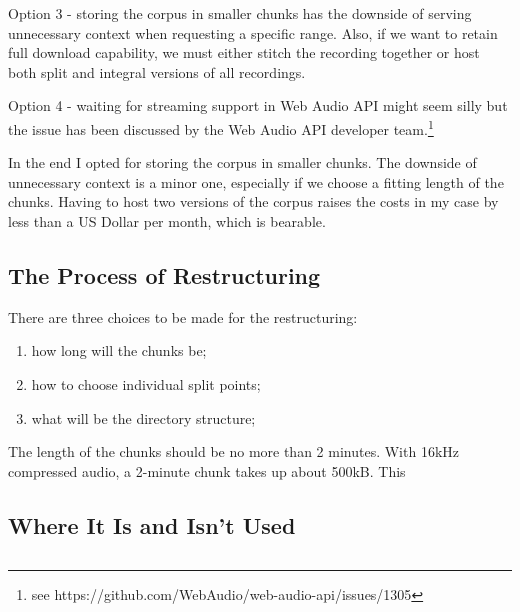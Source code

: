 Option 3 - storing the corpus in smaller chunks has the downside of serving
unnecessary context when requesting a specific range. Also, if we want to retain
full download capability, we must either stitch the recording together or host
both split and integral versions of all recordings.

Option 4 - waiting for streaming support in Web Audio API might seem silly but
the issue has been discussed by the Web Audio API developer team.\footnote{see
https://github.com/WebAudio/web-audio-api/issues/1305}

In the end I opted for storing the corpus in smaller chunks. The downside of
unnecessary context is a minor one, especially if we choose a fitting length of
the chunks. Having to host two versions of the corpus raises the costs in my
case by less than a US Dollar per month, which is bearable.

\subsection{The Process of Restructuring}

There are three choices to be made for the restructuring:
\begin{enumerate}
\item{how long will the chunks be;}
\item{how to choose individual split points;}
\item{what will be the directory structure;}
\end{enumerate}

The length of the chunks should be no more than 2 minutes. With 16kHz compressed
audio, a 2-minute chunk takes up about 500kB. This 

\subsection{Where It Is and Isn't Used}

\subsection{}


